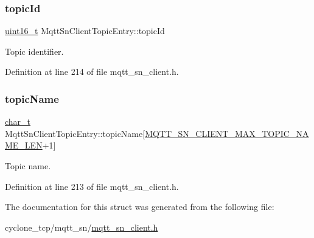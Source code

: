 \subsubsection{\texorpdfstring{topic\+Id}{topicId}}
{\footnotesize\ttfamily \hyperlink{stdint_8h_a273cf69d639a59973b6019625df33e30}{uint16\+\_\+t} Mqtt\+Sn\+Client\+Topic\+Entry\+::topic\+Id}



Topic identifier. 



Definition at line 214 of file mqtt\+\_\+sn\+\_\+client.\+h.

\mbox{\label{structMqttSnClientTopicEntry_aa9954fa1c2040839258e0dbb8c283d9f}} 
\subsubsection{\texorpdfstring{topic\+Name}{topicName}}
{\footnotesize\ttfamily \hyperlink{compiler__port_8h_a40bb5262bf908c328fbcfbe5d29d0201}{char\+\_\+t} Mqtt\+Sn\+Client\+Topic\+Entry\+::topic\+Name\mbox{[}\hyperlink{mqtt__sn__client_8h_a746a6fb4ce05f20c05f8a852a1e376e1}{M\+Q\+T\+T\+\_\+\+S\+N\+\_\+\+C\+L\+I\+E\+N\+T\+\_\+\+M\+A\+X\+\_\+\+T\+O\+P\+I\+C\+\_\+\+N\+A\+M\+E\+\_\+\+L\+EN}+1\mbox{]}}



Topic name. 



Definition at line 213 of file mqtt\+\_\+sn\+\_\+client.\+h.



The documentation for this struct was generated from the following file\+:\begin{DoxyCompactItemize}
\item 
cyclone\+\_\+tcp/mqtt\+\_\+sn/\hyperlink{mqtt__sn__client_8h}{mqtt\+\_\+sn\+\_\+client.\+h}\end{DoxyCompactItemize}
